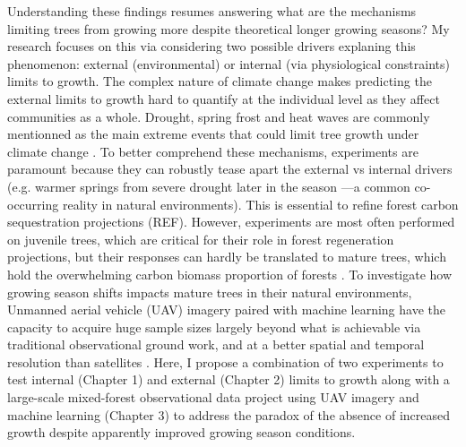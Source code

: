 \documentclass[12pt]{article}
\begin{document}
Understanding these findings resumes answering what are the mechanisms limiting trees from growing more despite theoretical longer growing seasons? My research focuses on this via considering two possible drivers explaning this phenomenon: external (environmental) \citep{kolar_response_2016} or internal (via physiological constraints)\citep{zohner_effect_2023} limits to growth. The complex nature of climate change makes predicting the external limits to growth hard to quantify at the individual level as they affect communities as a whole. Drought, spring frost and heat waves are commonly mentionned as the main extreme events that could limit tree growth under climate change \citep{drobyshev_influence_2008}. To better comprehend these mechanisms, experiments are paramount because they can robustly tease apart the external vs internal drivers (e.g. warmer springs from severe drought later in the season ---a common co-occurring reality in natural environments). This is essential to refine forest carbon sequestration projections (REF). However, experiments are most often performed on juvenile trees, which are critical for their role in forest regeneration projections, but their responses can hardly be translated to mature trees, which hold the overwhelming carbon biomass proportion of forests \citep{augspurger_differences_2003,silvestro_longer_2023,vitasse_ontogenic_2013}. To investigate how growing season shifts impacts mature trees in their natural environments, Unmanned aerial vehicle (UAV) imagery paired with machine learning have the capacity to acquire huge sample sizes largely beyond what is achievable via traditional observational ground work, and at a better spatial and temporal resolution than satellites \citep{berra_assessing_2019,piao_plant_2019,teng_bringing_2025}. Here, I propose a combination of two experiments to test internal (Chapter 1) and external (Chapter 2) limits to growth along with a large-scale mixed-forest observational data project using UAV imagery and machine learning (Chapter 3) to address the paradox of the absence of increased growth despite apparently improved growing season conditions. \\
\end{document}
